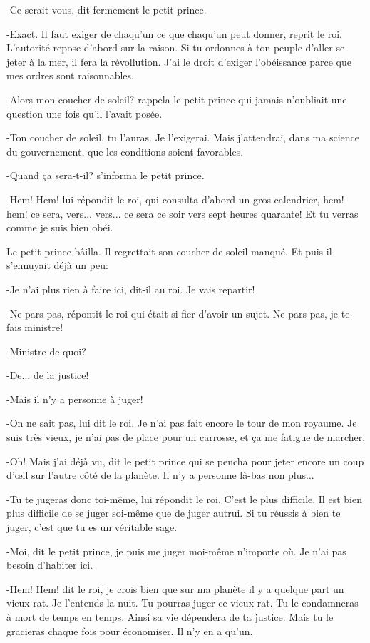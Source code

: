 \documentclass{report}
\begin{document}
-Ce serait vous, dit fermement le petit prince.

-Exact. Il faut exiger de chaqu'un ce que chaqu'un peut donner, reprit le roi. L'autorité repose d'abord sur la raison. Si tu ordonnes à ton peuple d'aller se jeter à la mer, il fera la révollution. J'ai le droit d'exiger l'obéissance parce que mes ordres sont raisonnables.

-Alors mon coucher de soleil? rappela le petit prince qui jamais n'oubliait une question une fois qu'il l'avait posée.

-Ton coucher de soleil, tu l'auras. Je l'exigerai. Mais j'attendrai, dans ma science du gouvernement, que les conditions soient favorables.

-Quand ça sera-t-il? s'informa le petit prince.

-Hem! Hem! lui répondit le roi, qui consulta d'abord un gros calendrier, hem! hem! ce sera, vers... vers... ce sera ce soir vers sept heures quarante! Et tu verras comme je suis bien obéi.

Le petit prince bâilla. Il regrettait son coucher de soleil manqué. Et puis il s'ennuyait déjà un peu:

-Je n'ai plus rien à faire ici, dit-il au roi. Je vais repartir!

-Ne pars pas, répontit le roi qui était si fier d'avoir un sujet. Ne pars pas, je te fais ministre!

-Ministre de quoi?

-De... de la justice!

-Mais il n'y a personne à juger!

-On ne sait pas, lui dit le roi. Je n'ai pas fait encore le tour de mon royaume. Je suis très vieux, je n'ai pas de place pour un carrosse, et ça me fatigue de marcher.

-Oh! Mais j'ai déjà vu, dit le petit prince qui se pencha pour jeter encore un coup d'œil sur l'autre côté de la planète. Il n'y a personne là-bas non plus...

-Tu te jugeras donc toi-même, lui répondit le roi. C'est le plus difficile. Il est bien plus difficile de se juger soi-même que de juger autrui. Si tu réussis à bien te juger, c'est que tu es un véritable sage.

-Moi, dit le petit prince, je puis me juger moi-même n'importe où. Je n'ai pas besoin d'habiter ici.

-Hem! Hem! dit le roi, je crois bien que sur ma planète il y a quelque part un vieux rat. Je l'entends la nuit. Tu pourras juger ce vieux rat. Tu le condamneras à mort de temps en temps. Ainsi sa vie dépendera de ta justice. Mais tu le gracieras chaque fois pour économiser. Il n'y en a qu'un.
\end{document}

